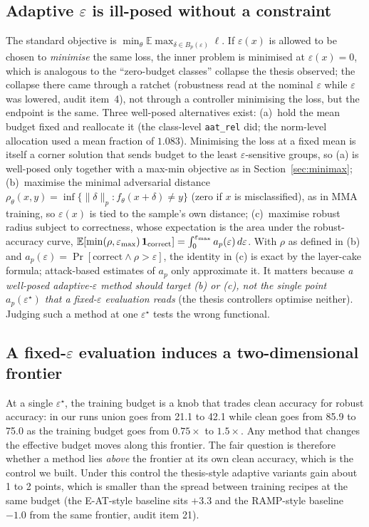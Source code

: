 \documentclass[11pt]{article}
\begin{document}
\subsection{Adaptive $\varepsilon$ is ill-posed without a constraint}
The standard objective is $\min_\theta \mathbb E\max_{\delta\in B_p(\varepsilon)}\ell$. If $\varepsilon(x)$ is allowed to be chosen to \emph{minimise} the same loss, the inner problem is minimised at $\varepsilon(x)=0$, which is analogous to the ``zero-budget classes'' collapse the thesis observed; the collapse there came through a ratchet (robustness read at the nominal $\varepsilon$ while $\varepsilon$ was lowered, audit item~4), not through a controller minimising the loss, but the endpoint is the same.
Three well-posed alternatives exist:
(a)~hold the mean budget fixed and reallocate it (the class-level \texttt{aat\_rel} did; the norm-level allocation used a mean fraction of $1.083$). Minimising the loss at a fixed mean is itself a corner solution that sends budget to the least $\varepsilon$-sensitive groups, so (a) is well-posed only together with a max-min objective as in Section~\ref{sec:minimax};
(b)~maximise the minimal adversarial distance $\rho_\theta(x,y)=\inf\{\|\delta\|_p:f_\theta(x{+}\delta)\neq y\}$ (zero if $x$ is misclassified), as in MMA training, so $\varepsilon(x)$ is tied to the sample's own distance;
(c)~maximise robust radius subject to correctness, whose expectation is the area under the robust-accuracy curve,
$\mathbb E[\min(\rho,\varepsilon_{\max})\,\mathbf 1_{\rm correct}]=\int_0^{\varepsilon_{\max}}a_p(\varepsilon)\,d\varepsilon$.
With $\rho$ as defined in (b) and $a_p(\varepsilon)=\Pr[\text{correct}\wedge\rho>\varepsilon]$, the identity in (c) is exact by the layer-cake formula; attack-based estimates of $a_p$ only approximate it. It matters because \emph{a well-posed adaptive-$\varepsilon$ method should target (b) or (c), not the single point $a_p(\varepsilon^\star)$ that a fixed-$\varepsilon$ evaluation reads} (the thesis controllers optimise neither). Judging such a method at one $\varepsilon^\star$ tests the wrong functional.

\subsection{A fixed-$\varepsilon$ evaluation induces a two-dimensional frontier}
At a single $\varepsilon^\star$, the training budget is a knob that trades clean accuracy for robust accuracy: in our runs union goes from 21.1 to 42.1 while clean goes from 85.9 to 75.0 as the training budget goes from $0.75\times$ to $1.5\times$.
Any method that changes the effective budget moves along this frontier. The fair question is therefore whether a method lies \emph{above} the frontier at its own clean accuracy, which is the control we built. Under this control the thesis-style adaptive variants gain about 1 to 2 points, which is smaller than the spread between training recipes at the same budget (the E-AT-style baseline sits $+3.3$ and the RAMP-style baseline $-1.0$ from the same frontier, audit item 21).
\end{document}
